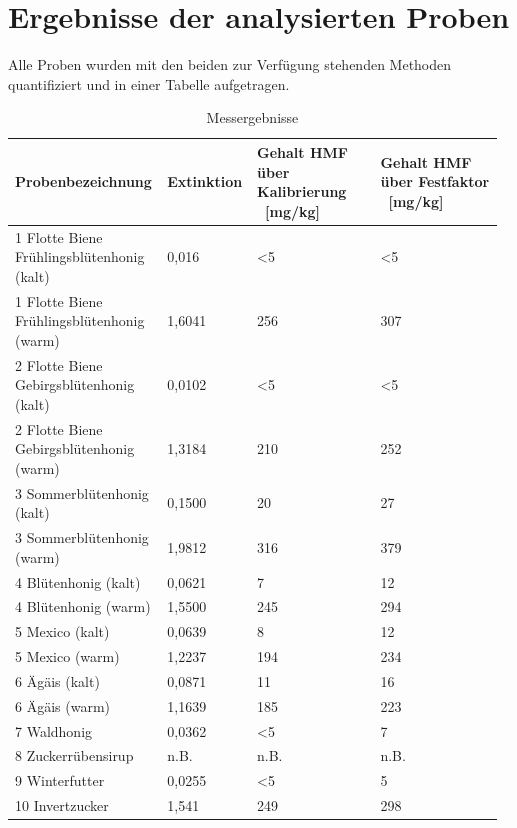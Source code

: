 \section{Ergebnisse der analysierten Proben}
Alle Proben wurden mit den beiden zur Verfügung stehenden Methoden quantifiziert und in einer Tabelle aufgetragen.

\begin{table}[htbp]
	\centering
		\begin{tabular}{p{0.30\linewidth}|p{0.17\linewidth}|p{0.25\linewidth}|p{0.25\linewidth}} 
			Probenbezeichnung & Extinktion & Gehalt HMF über Kalibrierung \ [mg/kg] &  Gehalt HMF über Festfaktor \ [mg/kg]\\
			\hline
			1 Flotte Biene Frühlingsblütenhonig (kalt) & 0,016 & <5 & <5\\
			\hline
			1 Flotte Biene Frühlingsblütenhonig (warm) & 1,6041 & 256 & 307\\
			\hline
			2 Flotte Biene Gebirgsblütenhonig (kalt) & 0,0102 & <5 & <5\\
			\hline
			2 Flotte Biene Gebirgsblütenhonig (warm) & 1,3184 & 210 & 252\\
			\hline
			3 Sommerblütenhonig (kalt) & 0,1500 & 20 & 27\\
			\hline
			3 Sommerblütenhonig (warm) & 1,9812 & 316 & 379\\
			\hline
			4 Blütenhonig (kalt) & 0,0621 & 7 & 12\\
			\hline
			4 Blütenhonig (warm) & 1,5500 & 245 & 294\\
			\hline
			5 Mexico (kalt) & 0,0639 & 8 & 12\\
			\hline
			5 Mexico (warm) & 1,2237 & 194 & 234\\
			\hline
			6 Ägäis (kalt) & 0,0871 & 11 & 16\\
			\hline
			6 Ägäis (warm) & 1,1639 & 185 & 223\\
			\hline
			7 Waldhonig & 0,0362 & <5 & 7\\
			\hline
			8 Zuckerrübensirup & n.B. & n.B. & n.B.\\
			\hline
			9 Winterfutter & 0,0255 & <5 & 5\\
			\hline
			10 Invertzucker & 1,541 & 249 & 298\\

		\end{tabular}
	\caption{Messergebnisse}
	\label{tab:Messergebnisse}
\end{table}

